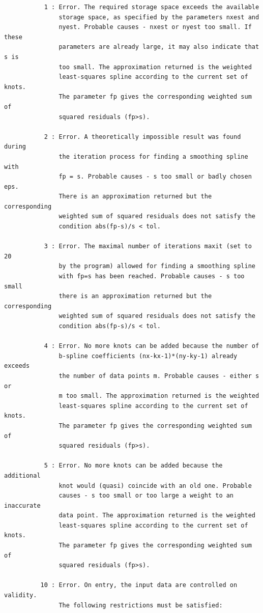 \documentclass[11pt,twoside]{article}
\begin{document}
\begin{verbatim}
           1 : Error. The required storage space exceeds the available
               storage space, as specified by the parameters nxest and
               nyest. Probable causes - nxest or nyest too small. If these
               parameters are already large, it may also indicate that s is
               too small. The approximation returned is the weighted 
               least-squares spline according to the current set of knots.
               The parameter fp gives the corresponding weighted sum of
               squared residuals (fp>s).

           2 : Error. A theoretically impossible result was found during
               the iteration process for finding a smoothing spline with
               fp = s. Probable causes - s too small or badly chosen eps.
               There is an approximation returned but the corresponding
               weighted sum of squared residuals does not satisfy the
               condition abs(fp-s)/s < tol.

           3 : Error. The maximal number of iterations maxit (set to 20
               by the program) allowed for finding a smoothing spline
               with fp=s has been reached. Probable causes - s too small
               there is an approximation returned but the corresponding
               weighted sum of squared residuals does not satisfy the
               condition abs(fp-s)/s < tol.

           4 : Error. No more knots can be added because the number of
               b-spline coefficients (nx-kx-1)*(ny-ky-1) already exceeds
               the number of data points m. Probable causes - either s or 
               m too small. The approximation returned is the weighted 
               least-squares spline according to the current set of knots.
               The parameter fp gives the corresponding weighted sum of
               squared residuals (fp>s).

           5 : Error. No more knots can be added because the additional
               knot would (quasi) coincide with an old one. Probable
               causes - s too small or too large a weight to an inaccurate 
               data point. The approximation returned is the weighted
               least-squares spline according to the current set of knots.
               The parameter fp gives the corresponding weighted sum of
               squared residuals (fp>s).

          10 : Error. On entry, the input data are controlled on validity.
               The following restrictions must be satisfied:


\end{verbatim}
\end{document}
